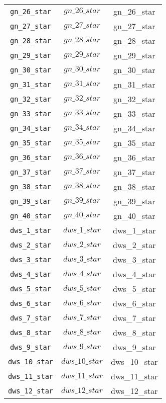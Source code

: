 \begin{center}
\begin{longtable}{ccc}
\texttt{gn\_26\_star} & $gn\_26\_star$ & gn\_26\_star\\
\texttt{gn\_27\_star} & $gn\_27\_star$ & gn\_27\_star\\
\texttt{gn\_28\_star} & $gn\_28\_star$ & gn\_28\_star\\
\texttt{gn\_29\_star} & $gn\_29\_star$ & gn\_29\_star\\
\texttt{gn\_30\_star} & $gn\_30\_star$ & gn\_30\_star\\
\texttt{gn\_31\_star} & $gn\_31\_star$ & gn\_31\_star\\
\texttt{gn\_32\_star} & $gn\_32\_star$ & gn\_32\_star\\
\texttt{gn\_33\_star} & $gn\_33\_star$ & gn\_33\_star\\
\texttt{gn\_34\_star} & $gn\_34\_star$ & gn\_34\_star\\
\texttt{gn\_35\_star} & $gn\_35\_star$ & gn\_35\_star\\
\texttt{gn\_36\_star} & $gn\_36\_star$ & gn\_36\_star\\
\texttt{gn\_37\_star} & $gn\_37\_star$ & gn\_37\_star\\
\texttt{gn\_38\_star} & $gn\_38\_star$ & gn\_38\_star\\
\texttt{gn\_39\_star} & $gn\_39\_star$ & gn\_39\_star\\
\texttt{gn\_40\_star} & $gn\_40\_star$ & gn\_40\_star\\
\texttt{dws\_1\_star} & $dws\_1\_star$ & dws\_1\_star\\
\texttt{dws\_2\_star} & $dws\_2\_star$ & dws\_2\_star\\
\texttt{dws\_3\_star} & $dws\_3\_star$ & dws\_3\_star\\
\texttt{dws\_4\_star} & $dws\_4\_star$ & dws\_4\_star\\
\texttt{dws\_5\_star} & $dws\_5\_star$ & dws\_5\_star\\
\texttt{dws\_6\_star} & $dws\_6\_star$ & dws\_6\_star\\
\texttt{dws\_7\_star} & $dws\_7\_star$ & dws\_7\_star\\
\texttt{dws\_8\_star} & $dws\_8\_star$ & dws\_8\_star\\
\texttt{dws\_9\_star} & $dws\_9\_star$ & dws\_9\_star\\
\texttt{dws\_10\_star} & $dws\_10\_star$ & dws\_10\_star\\
\texttt{dws\_11\_star} & $dws\_11\_star$ & dws\_11\_star\\
\texttt{dws\_12\_star} & $dws\_12\_star$ & dws\_12\_star\\

\end{longtable}
\end{center}
